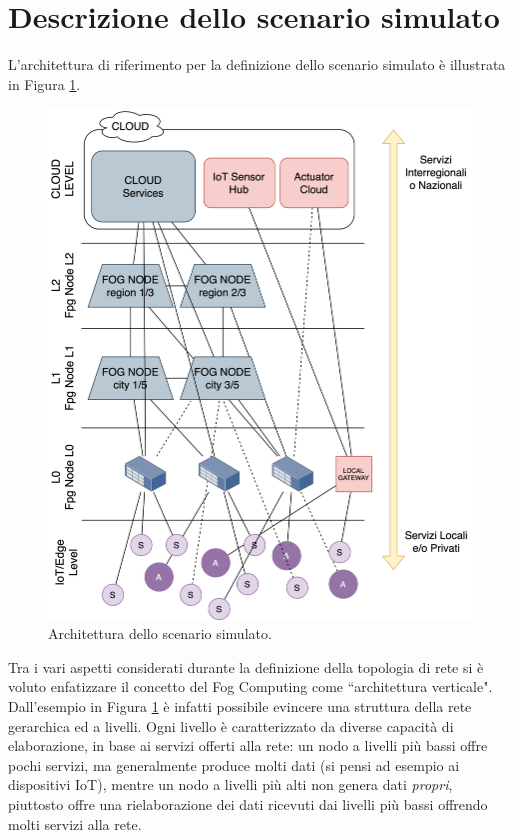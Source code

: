 \section{Descrizione dello scenario simulato}

L'architettura di riferimento per la definizione dello scenario simulato è illustrata in Figura \ref{fig:architettura_scenario}.

\begin{figure}[!ht]
  \includegraphics[width=14cm]{images/architettura_scenario}
  \centering
  \caption{Architettura dello scenario simulato.}
  \label{fig:architettura_scenario}
\end{figure}

Tra i vari aspetti considerati durante la definizione della topologia di rete si è voluto enfatizzare il concetto del Fog Computing come ``architettura verticale". Dall'esempio in Figura \ref{fig:architettura_scenario} è infatti possibile evincere una struttura della rete gerarchica ed a livelli. Ogni livello è caratterizzato da diverse capacità di elaborazione, in base ai servizi offerti alla rete: un nodo a livelli più bassi offre pochi servizi, ma generalmente produce molti dati (si pensi ad esempio ai dispositivi IoT), mentre un nodo a livelli più alti non genera dati \textit{propri}, piuttosto offre una rielaborazione dei dati ricevuti dai livelli più bassi offrendo molti servizi alla rete.

